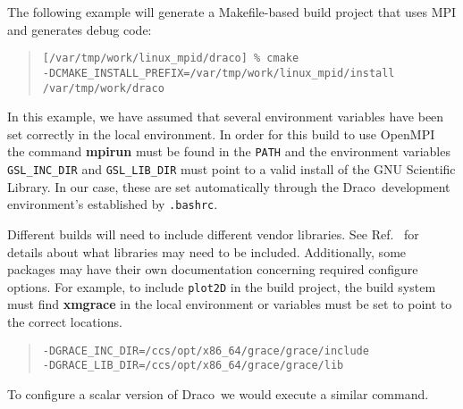 \documentclass[11pt]{nmemo}
\newcommand{\comp}[1]{\normalfont\footnotesize\texttt{#1}\normalsize}
\newcommand{\draco}{{\normalfont\sffamily Draco}}
\newcommand{\openmpi}{{\normalfont\sffamily OpenMPI}}
\begin{document}
The following example will generate a Makefile-based build project
that uses MPI and generates debug code:

\footnotesize
\begin{verse}
\texttt{[/var/tmp/work/linux\_mpid/draco] \% cmake \\
  \hspace{0.5in}-DCMAKE\_INSTALL\_PREFIX=/var/tmp/work/linux\_mpid/install
  /var/tmp/work/draco} \\
\end{verse}
\normalsize

In this example, we have assumed that several environment variables
have been set correctly in the local environment.  In order for this
build to use \openmpi\, the command \textbf{mpirun} must be found in
the \comp{PATH} and the environment variables \comp{GSL\_INC\_DIR}
and \comp{GSL\_LIB\_DIR} must point to a valid install of the GNU
Scientific Library.  In our case, these are set automatically through
the \draco\ development environment's established by \comp{.bashrc}.

Different builds will need to include different vendor libraries.  See
Ref.~\cite{draco-build} for details about what libraries may need to
be included.  Additionally, some packages may have their own
documentation concerning required configure options.  For example, to
include \comp{plot2D} in the build project, the build system must
find \textbf{xmgrace} in the local environment or variables must be
set to point to the correct locations.

\footnotesize
\begin{verse}
\texttt{-DGRACE\_INC\_DIR=/ccs/opt/x86\_64/grace/grace/include \\
-DGRACE\_LIB\_DIR=/ccs/opt/x86\_64/grace/grace/lib}
\end{verse}
\normalsize

To configure a scalar version of \draco\ we would execute a similar command.
\end{document}
